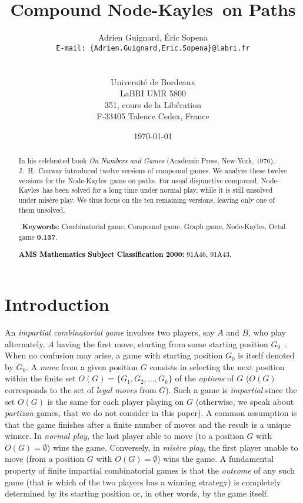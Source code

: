 \documentclass[11pt]{article}
\newcommand{\modif}[1]{\textcolor{black}{#1}}
\newcommand{\NK}{Node-Kayles}
\newcommand{\keywords}[1]{\ \newline \noindent \textbf{Keywords: }#1}
\let\oldtitle=\title
\renewcommand{\title}[1]{\oldtitle{\Large{\textbf{#1}}}}
\newcommand{\institute}[1]{\newline \noindent
  \begin{minipage}{\textwidth}\begin{center}{\small #1}\end{center}\end{minipage}}
\newcommand{\email}[1]{{\small{\tt E-mail: #1}}}
\begin{document}
\title{Compound \NK\ on Paths}

\author{Adrien Guignard, \'Eric Sopena\\
  \email{{\small\tt \{Adrien.Guignard,Eric.Sopena\}@labri.fr}} \\ \ \\
  \institute{Universit\'e de Bordeaux \\
    LaBRI UMR 5800\\
    351, cours de la Lib\'eration \\
    F-33405 Talence Cedex, France}}

\date{\today}

\maketitle

\begin{abstract}
In his celebrated book {\em On \modif{Numbers} and Games} (Academic Press, New-York, 1976),
J.~H.~Conway introduced twelve versions of compound games. We analyze these twelve
versions for the \NK\ game on paths. For usual disjunctive compound, \NK\ has been
solved for a long time under normal play, while it is still unsolved under mis\`ere play.
We thus focus on the ten remaining versions, leaving only one of them unsolved.

\keywords{Combinatorial game, Compound game, Graph game, \NK, Octal game {\bf 0.137}.}

\noindent\modif{{\bf AMS Mathematics Subject Classification 2000:} 91A46, 91A43.}
\end{abstract}

\section{Introduction}

An {\em impartial combinatorial game} involves two players, say $A$ and $B$,
who play alternately, $A$ having the first move, starting from some
starting position $G_0$~\cite{WW,ONAG}. When no confusion may arise, a game with starting
position $G_0$ is itself denoted by $G_0$. A {\em move} from a given
position $G$ consists in selecting the next position
within the finite set $O(G)=\{G_1,G_2,\dots,G_k\}$ of the {\em options} of $G$
($O(G)$ corresponds to the set of {\em legal moves} from $G$).
Such a game is {\em impartial} since the set $O(G)$ is the same for each player
playing on $G$ (otherwise, we speak about {\em partizan} games, that
we do not consider in this paper).
A common assumption is that the game finishes after a finite number of
moves and the result is a unique winner.
In {\em normal play}, the last player able to move (to a position
$G$ with $O(G)=\emptyset$) wins the game. Conversely, in {\em mis\`ere play},
the first player unable to move (from a position
$G$ with $O(G)=\emptyset$) wins the game.
A fundamental property of finite impartial combinatorial games is that
the {\em outcome} of any such game (that is which of the two
players has a winning strategy)
is completely determined by its starting position or, in other
words, by the game itself.
\end{document}
